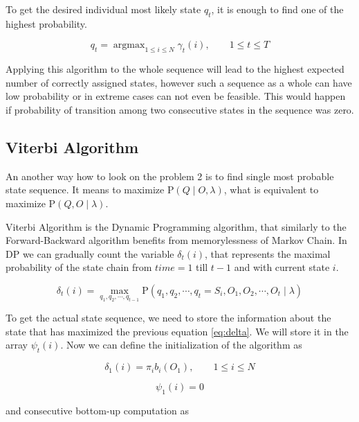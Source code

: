 \documentclass[thesis=M,english]{FITthesis}[2012/10/20]
\newcommand{\argmax}{\mathop{\mathrm{argmax}}}
\begin{document}
To get the desired individual most likely state $q_t$, it is enough to find one of the highest probability.

\begin{equation}
q_t = \argmax_{1 \leq i \leq N} \gamma_t(i), \qquad 1 \leq t \leq T
\end{equation} 

Applying this algorithm to the whole sequence will lead to the highest expected number of correctly assigned states, however such a sequence as a whole can have low probability or in extreme cases can not even be feasible. This would happen if probability of transition among two consecutive states in the sequence was zero.   
   
\subsection{Viterbi Algorithm} 

An another way how to look on the problem 2 is to find single most probable state sequence. It means to maximize $\mathrm{P}(Q\mid O,\lambda)$, what is equivalent to maximize $\mathrm{P}(Q,O\mid\lambda)$.

Viterbi Algorithm is the Dynamic Programming algorithm, that similarly to the Forward-Backward algorithm  benefits from memorylessness of Markov Chain. In DP we can gradually count the variable $\delta_t(i)$, that represents the maximal probability of the state chain from $time = 1$ till $t-1$ and with current state $i$.

\begin{equation}\label{eq:delta}
\delta_t(i) = \max_{q_1,q_2,\cdots,q_{t-1}} \mathrm{P}( q_1,q_2,\cdots, q_t = S_i, O_1, O_2, \cdots, O_t \mid \lambda )
\end{equation}

To get the actual state sequence, we need to store the information about the state that has maximized the previous equation \eqref{eq:delta}. We will store it in the array $\psi_t(i)$. Now we can define the initialization of the algorithm as

\begin{equation}
\delta_1(i) = \pi_i b_i(O_1), \qquad 1 \leq i \leq N 
\end{equation}

\begin{equation}
\psi_1(i) = 0 
\end{equation}

and consecutive bottom-up computation as
\end{document}
